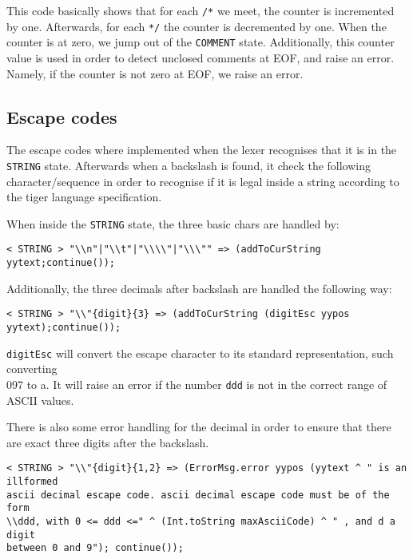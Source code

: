 \documentclass{article}
\begin{document}
This code basically shows that for each \texttt{/*} we meet, the counter is incremented by one. Afterwards, for each \texttt{*/} the counter is decremented by one. When the counter is at zero, we jump out of the \texttt{COMMENT} state. Additionally, this counter value is used in order to detect unclosed comments at EOF, and raise an error. Namely, if the counter is not zero at EOF, we raise an error.

\subsection{Escape codes}
The escape codes where implemented when the lexer recognises that it is in the \texttt{STRING} state. Afterwards when a backslash is found, it check the following character/sequence in order to recognise if it is legal inside a string according to the tiger language specification. 


When inside the \texttt{STRING} state, the three basic chars are handled by:

\begin{lstlisting}[frame=single]
< STRING > "\\n"|"\\t"|"\\\\"|"\\\"" => (addToCurString yytext;continue());
\end{lstlisting}

Additionally, the three decimals after backslash are handled the following way:

\begin{lstlisting}[frame=single]
< STRING > "\\"{digit}{3} => (addToCurString (digitEsc yypos yytext);continue());
\end{lstlisting}

\texttt{digitEsc} will convert the escape character to its standard representation, such converting \\097 to a. It will raise an error if the number \texttt{ddd} is not in the correct range of ASCII values. 

There is also some error handling for the decimal in order to ensure that there are exact three digits after the backslash.
\begin{lstlisting}[frame=single]
< STRING > "\\"{digit}{1,2} => (ErrorMsg.error yypos (yytext ^ " is an illformed 
ascii decimal escape code. ascii decimal escape code must be of the form 
\\ddd, with 0 <= ddd <=" ^ (Int.toString maxAsciiCode) ^ " , and d a digit 
between 0 and 9"); continue());
\end{lstlisting}
\end{document}

